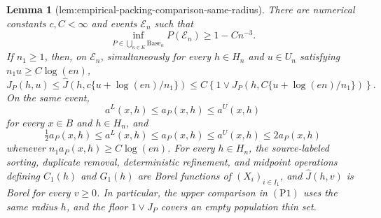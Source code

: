 \documentclass{article}
\newtheorem{lemma}{Lemma}
\begin{document}
\begin{lemma}[lem:empirical-packing-comparison-same-radius]\label{lem:empirical-packing-comparison-same-radius}
There are numerical constants \(c,C<\infty\) and events \(\mathcal E_n\) such that
\[
 \inf_{P\in\bigcup_{\kappa\in K}\mathrm{Base}_\kappa}P(\mathcal E_n)
 \geq 1-Cn^{-3}.
\]
If \(n_1\geq1\), then, on \(\mathcal E_n\), simultaneously for every
\(h\in H_n\) and \(u\in U_n\) satisfying
\(n_1u\geq C\log(en)\),
\[
 J_P(h,u)
 \leq \widehat J\!\left(h,c\{u+\log(en)/n_1\}\right)
 \leq C\left\{1\vee
 J_P\!\left(h,C\{u+\log(en)/n_1\}\right)\right\}.                 \tag{P1}
\]
On the same event,
\[
 a^L(x,h)\leq a_P(x,h)\leq a^U(x,h)                              \tag{P2}
\]
for every \(x\in B\) and \(h\in H_n\), and
\[
 \tfrac12a_P(x,h)\leq a^L(x,h)\leq a_P(x,h)\leq a^U(x,h)\leq2a_P(x,h) \tag{P3}
\]
whenever \(n_1a_P(x,h)\geq C\log(en)\).  For every \(h\in H_n\), the
source-labeled sorting, duplicate removal, deterministic refinement, and
midpoint operations defining \(C_1(h)\) and \(G_1(h)\) are Borel functions
of \((X_i)_{i\in I_1}\), and \(\widehat J(h,v)\) is Borel for every
\(v\geq0\).  In particular, the upper comparison in \((\mathrm{P1})\) uses
the same radius \(h\), and the floor \(1\vee J_P\) covers an empty population
thin set.
\end{lemma}
\end{document}

